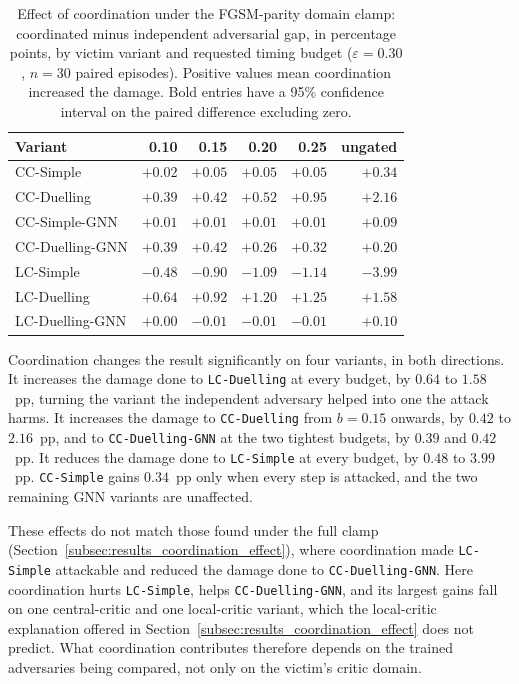 \begin{table}[htbp]
  \centering
  \caption{Effect of coordination under the FGSM-parity domain clamp: coordinated minus
           independent adversarial gap, in percentage points, by victim variant and
           requested timing budget ($\varepsilon = 0.30$, $n = 30$ paired episodes).
           Positive values mean coordination increased the damage. Bold entries have a
           95\% confidence interval on the paired difference excluding zero.}
  \label{tab:coordination_effect_parity}
  \begin{tabular}{lrrrrr}
    \hline
    \textbf{Variant} & \textbf{0.10} & \textbf{0.15} & \textbf{0.20} & \textbf{0.25} & \textbf{ungated} \\
    \hline
    CC-Simple        & $+0.02$ & $+0.05$ & $+0.05$ & $+0.05$ & $\mathbf{+0.34}$ \\
    CC-Duelling      & $+0.39$ & $\mathbf{+0.42}$ & $\mathbf{+0.52}$ & $\mathbf{+0.95}$ & $\mathbf{+2.16}$ \\
    CC-Simple-GNN    & $+0.01$ & $+0.01$ & $+0.01$ & $+0.01$ & $+0.09$ \\
    CC-Duelling-GNN  & $\mathbf{+0.39}$ & $\mathbf{+0.42}$ & $+0.26$ & $+0.32$ & $+0.20$ \\
    LC-Simple        & $\mathbf{-0.48}$ & $\mathbf{-0.90}$ & $\mathbf{-1.09}$ & $\mathbf{-1.14}$ & $\mathbf{-3.99}$ \\
    LC-Duelling      & $\mathbf{+0.64}$ & $\mathbf{+0.92}$ & $\mathbf{+1.20}$ & $\mathbf{+1.25}$ & $\mathbf{+1.58}$ \\
    LC-Duelling-GNN  & $+0.00$ & $-0.01$ & $-0.01$ & $-0.01$ & $+0.10$ \\
    \hline
  \end{tabular}
\end{table}

Coordination changes the result significantly on four variants, in both directions. It
increases the damage done to \texttt{LC-Duelling} at every budget, by $0.64$ to
$1.58$~pp, turning the variant the independent adversary helped into one the attack
harms. It increases the damage to \texttt{CC-Duelling} from $b = 0.15$ onwards, by
$0.42$ to $2.16$~pp, and to \texttt{CC-Duelling-GNN} at the two tightest budgets, by
$0.39$ and $0.42$~pp. It reduces the damage done to \texttt{LC-Simple} at every budget,
by $0.48$ to $3.99$~pp. \texttt{CC-Simple} gains $0.34$~pp only when every step is
attacked, and the two remaining GNN variants are unaffected.

These effects do not match those found under the full clamp
(Section~\ref{subsec:results_coordination_effect}), where coordination made
\texttt{LC-Simple} attackable and reduced the damage done to \texttt{CC-Duelling-GNN}.
Here coordination hurts \texttt{LC-Simple}, helps \texttt{CC-Duelling-GNN}, and its
largest gains fall on one central-critic and one local-critic variant, which the
local-critic explanation offered in Section~\ref{subsec:results_coordination_effect}
does not predict. What coordination contributes therefore depends on the trained
adversaries being compared, not only on the victim's critic domain.

